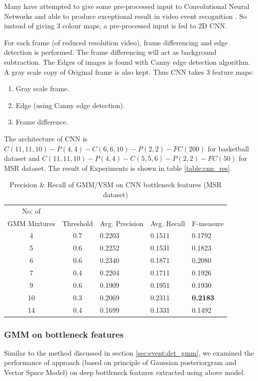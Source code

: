 Many have attempted to give some pre-processed input to Convolutional Neural Networks and able to produce exceptional result in video event recognition \citep{ji20133d}. So instead of giving 3 colour maps, a pre-processed input is fed to 2D CNN.

For each frame (of reduced resolution video), frame differencing and edge detection is performed. The frame differencing will act as background subtraction. The Edges of images is found with Canny edge detection algorithm. A gray scale copy of Original frame is also kept. Thus CNN takes 3 feature maps:
\begin{enumerate}
\item Gray scale frame.
\item Edge (using Canny edge detection).
\item Frame difference.
\end{enumerate}

The architecture of CNN is $C(11, 11, 10)-P(4, 4)-C(6, 6, 10)-P(2, 2)-FC(200)$ for basketball dataset and $C(11, 11, 10)-P(4,4)-C(5, 5, 6)-P(2,2)-FC(50)$ for MSR dataset. The result of Experiments is shown in table \ref{table:cnn_res}.

\begin{table}[h]
\centering
\begin{tabular}{|c|c|l|l|l|}
\hline
No: of &&&&\\
GMM Mixtures & Threshold & Avg. Precision & Avg. Recall & F-measure\\
\hline
\hline
 4 	&0.7 	&0.2203 	& 0.1511	&0.1792\\
 5 	&0.6 	&0.2252 	& 0.1531	&0.1823\\
 6 	&0.6 	&0.2340 	& 0.1871	&0.2080\\
 7 	&0.4 	&0.2204 	& 0.1711	&0.1926\\
 9 	&0.6 	&0.1909 	& 0.1951	&0.1930\\
10 	&0.3 	&0.2069 	& 0.2311	&\textbf{0.2183}\\
14 	&0.4 	&0.1699 	& 0.1331	&0.1492\\
\hline  
\end{tabular}
\caption[Event spotting using GMM/VSM on CNN(Gray,Frame diff,Edge) bottleneck features (MSR Action Dataset) ]{ Precision \& Recall  of GMM/VSM on CNN bottleneck features (MSR dataset)}
\label{table:cnn_gmm_res_msr}
\end{table} 

\subsubsection{GMM on bottleneck features}
Similar to the method discussed in section \ref{sec:event:dct_gmm}, we examined the performance of approach (based on principle of Gaussian posteriorgram and Vector Space Model) on deep bottleneck features extracted using above model. 

